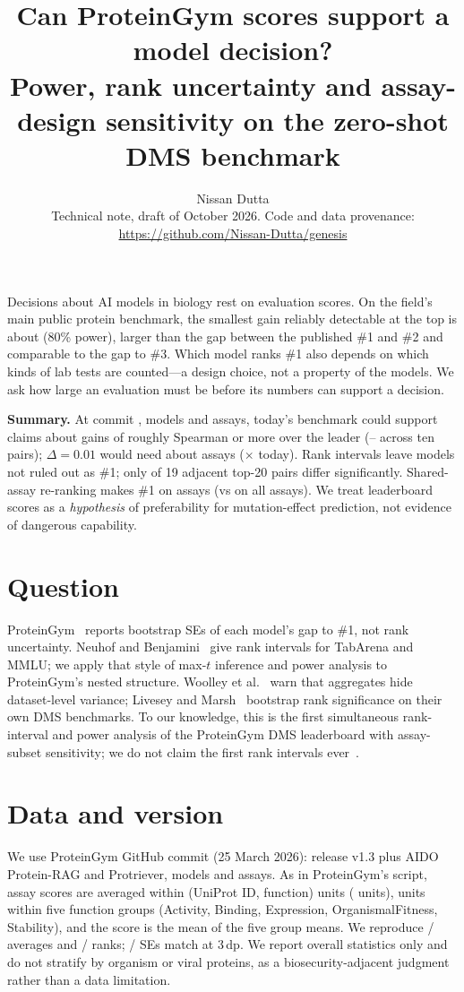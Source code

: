 \documentclass[9pt,twocolumn]{extarticle}
\title{\vspace{-1.2cm}\bfseries\large Can ProteinGym scores support a model decision?\\
\normalsize Power, rank uncertainty and assay-design sensitivity on the zero-shot DMS benchmark}
\author{Nissan Dutta\\\small Technical note, draft of October 2026. Code and data provenance:
\url{https://github.com/Nissan-Dutta/genesis}}
\date{\vspace{-0.9cm}}
\begin{document}
\maketitle

\noindent Decisions about AI models in biology rest on evaluation scores. On the field's main public protein benchmark,
the smallest gain reliably detectable at the top is about \mddAtTop{} (80\% power), larger than the gap between the
published \#1 and \#2 and comparable to the gap to \#3. Which model ranks \#1 also depends on which kinds of lab tests
are counted---a design choice, not a property of the models. We ask how large an evaluation must be before its numbers
can support a decision.

\noindent\textbf{Summary.} At commit \pgCommit{}, \nModels{} models and \nAssays{} assays, today's benchmark could
support claims about gains of roughly \mddMed{} Spearman or more over the leader (\mddMin--\mddMax{} across ten pairs);
$\Delta=0.01$ would need about \assaysTenMed{} assays (\timesTenMed$\times$ today). Rank intervals leave \nBestSet{}
models not ruled out as \#1; only \nNeighbourSig{} of 19 adjacent top-20 pairs differ significantly. Shared-assay
re-ranking makes \topAllCommon{} \#1 on \nCommonAssays{} assays (vs \topPublished{} on all assays). We treat leaderboard
scores as a \emph{hypothesis} of preferability for mutation-effect prediction, not evidence of dangerous capability.

\section{Question}
ProteinGym~\cite{notin2023proteingym} reports bootstrap SEs of each model's gap to \#1, not rank uncertainty.
Neuhof and Benjamini~\cite{neuhof2026rank} give rank intervals for TabArena and MMLU; we apply that style of max-$t$
inference and power analysis to ProteinGym's nested structure. Woolley et al.~\cite{woolley2026overestimating} warn
that aggregates hide dataset-level variance; Livesey and Marsh~\cite{livesey2023updated,livesey2025variant} bootstrap
rank significance on their own DMS benchmarks. To our knowledge, this is the first simultaneous rank-interval and
power analysis of the ProteinGym DMS leaderboard with assay-subset sensitivity; we do not claim the first rank
intervals ever~\cite{neuhof2026rank,chiang2024chatbot}.

\section{Data and version}
We use ProteinGym GitHub commit \pgCommit{} (25 March 2026): release v1.3 plus AIDO Protein-RAG and Protriever,
\nModels{} models and \nAssays{} assays. As in ProteinGym's script, assay scores are averaged within
(UniProt ID, function) units (\nUnits{} units), units within five function groups (Activity, Binding, Expression,
OrganismalFitness, Stability), and the score is the mean of the five group means. We reproduce \nExactAverage{}/\nModels{} averages and \nExactRank{}/\nModels{} ranks; \nExactSE{}/\nModels{} SEs match
at 3\,dp. We report overall statistics only and do not stratify by organism or viral proteins, as a
biosecurity-adjacent judgment rather than a data limitation.
\end{document}
